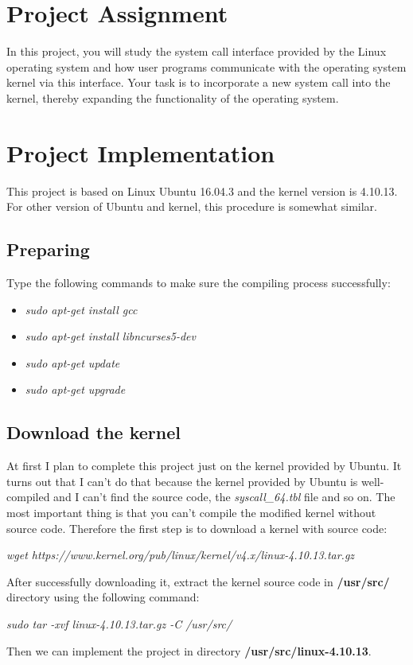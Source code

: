 \documentclass[12pt]{article}
\begin{document}

\tableofcontents
\pagebreak


\section{Project Assignment}
In this project, you will study the system call interface provided by the Linux operating system and how user programs communicate with the operating system kernel via this interface. Your task is to incorporate a new system call into the kernel, thereby expanding the functionality of the operating system.
\section{Project Implementation}
This project is based on Linux Ubuntu 16.04.3 and the kernel version is 4.10.13. For other version of Ubuntu and kernel, this procedure is somewhat similar.
\subsection{Preparing}
Type the following commands to make sure the compiling process successfully:
\begin{itemize}
	\item \emph{sudo apt-get install gcc}
	\item \emph{sudo apt-get install libncurses5-dev}
	\item \emph{sudo apt-get update}
	\item \emph{sudo apt-get upgrade}
\end{itemize}
\subsection{Download the kernel}
At first I plan to complete this project just on the kernel provided by Ubuntu. It turns out that I can't do that because the kernel provided by Ubuntu is well-compiled and I can't find the source code, the \emph{syscall\_64.tbl} file and so on. The most important thing is that you can't compile the modified kernel without source code. Therefore the first step is to download a kernel with source code:
\begin{center}
\emph{
wget https://www.kernel.org/pub/linux/kernel/v4.x/linux-4.10.13.tar.gz}
\end{center}
After successfully downloading it, extract the kernel source code in \textbf{/usr/src/} directory using the following command:
\begin{center}
	\emph{sudo tar -xvf linux-4.10.13.tar.gz -C /usr/src/}
\end{center}
Then we can implement the project in directory \textbf{/usr/src/linux-4.10.13}.
\end{document}

